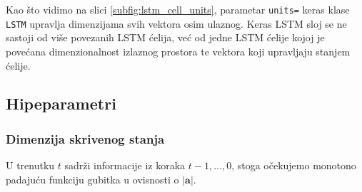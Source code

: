\documentclass[conference]{IEEEtran}
\begin{document}
\begin{figure}[H]
{
}
\caption{ }
\end{figure}

Kao što vidimo na slici \ref{subfig:lstm_cell_units}, parametar \texttt{units=} keras klase \texttt{LSTM} upravlja dimenzijama svih vektora osim ulaznog. Keras LSTM sloj se ne sastoji od više povezanih LSTM ćelija, već od jedne LSTM ćelije kojoj je povećana dimenzionalnost izlaznog prostora te vektora koji upravljaju stanjem ćelije.


\subsection{Hipeparametri}

\subsubsection{Dimenzija skrivenog stanja}
U trenutku $t$ sadrži informacije iz koraka ${t-1, ..., 0}$, stoga očekujemo monotono padajuću funkciju gubitka u ovisnosti o $\lvert \mathbf{a} \rvert$.
\end{document}
